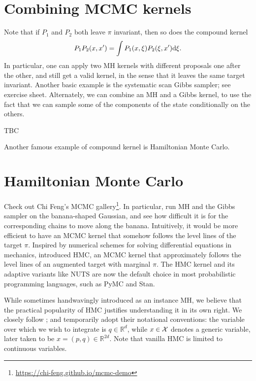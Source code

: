 \section{Combining MCMC kernels}
Note that if $P_1$ and $P_2$ both leave $\pi$ invariant, then so does the compound kernel
$$
    P_1P_2(x, x') = \int P_1(x, \xi)P_2(\xi, x') \mathrm{d}\xi.
$$
In particular, one can apply two MH kernels with different proposals one after the other, and still get a valid kernel, in the sense that it leaves the same target invariant. 
Another basic example is the systematic scan Gibbs sampler; see exercise sheet.
Alternately, we can combine an MH and a Gibbs kernel, to use the fact that we can sample some of the components of the state conditionally on the others.

\begin{example}
    TBC
\end{example}

Another famous example of compound kernel is Hamiltonian Monte Carlo.

\section{Hamiltonian Monte Carlo}
\label{s:HMC}

Check out Chi Feng's MCMC gallery\footnote{\url{https://chi-feng.github.io/mcmc-demo}}.
In particular, run MH and the Gibbs sampler on the banana-shaped Gaussian, and see how difficult it is for the corresponding chains to move along the banana. 
Intuitively, it would be more efficient to have an MCMC kernel that somehow follows the level lines of the target $\pi$. 
Inspired by numerical schemes for solving differential equations in mechanics, \cite{Nea00} introduced HMC, an MCMC kernel that approximately follows the level lines of an augmented target with marginal $\pi$.
The HMC kernel and its adaptive variants like NUTS are now the default choice in most probabilistic programming languages, such as PyMC and Stan.

While sometimes handwavingly introduced as an instance MH, we believe that the practical popularity of HMC justifies understanding it in its own right.
We closely follow \cite{BoSa18}; and temporarily adopt their notational conventions: the variable over which we wish to integrate is $q\in\mathbb{R}^d$, while $x\in\mathcal{X}$ denotes a generic variable, later taken to be $x=(p,q)\in\mathbb{R}^{2d}$.
Note that vanilla HMC is limited to continuous variables.

